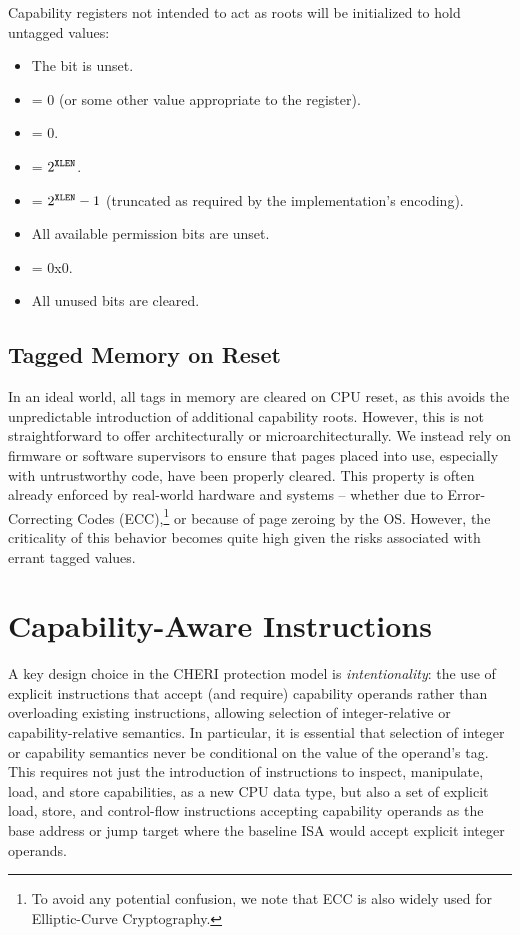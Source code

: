 \noindent
Capability registers not intended to act as roots will be
initialized to hold untagged values:

\begin{itemize}
\item
The \ctag{} bit is unset.
\item
\coffset{} = 0 (or some other value appropriate to the register).
\item
\cbase{} = 0.
\item
\clength{} = $2^{{\texttt{XLEN}}{}}$.
\item
\cotype{} = $2^{{\texttt{XLEN}}{}}-1$ (truncated as required by the implementation's encoding).
\item
All available permission bits are unset.
\item
\cflags{} = 0x0.
\item
All unused bits are cleared.
\end{itemize}

\subsection{Tagged Memory on Reset}

In an ideal world, all tags in memory are cleared on CPU reset, as this avoids
the unpredictable introduction of additional capability roots.
However, this is not straightforward to offer architecturally or
microarchitecturally.
We instead rely on firmware or software supervisors to ensure that pages
placed into use, especially with untrustworthy code, have been properly
cleared.
This property is often already enforced by real-world hardware and
systems -- whether due to Error-Correcting Codes
(ECC),\footnote{To avoid any potential confusion, we note that ECC is also widely used for Elliptic-Curve Cryptography.} or because of page zeroing by the OS.
However, the criticality of this behavior becomes quite high given the risks
associated with errant tagged values.

\section{Capability-Aware Instructions}
\label{sec:capability-aware-instructions}

A key design choice in the CHERI protection model is \textit{intentionality}:
the use of explicit instructions that accept (and require) capability
operands rather than overloading existing instructions, allowing selection of
integer-relative or capability-relative semantics.
In particular, it is essential that selection of integer or capability
semantics never be conditional on the value of the operand's tag.
This requires not just the introduction of instructions to inspect,
manipulate, load, and store capabilities, as a new CPU data type, but also a
set of explicit load, store, and control-flow instructions accepting capability
operands as the base address or jump target where the baseline ISA would
accept explicit integer operands.

